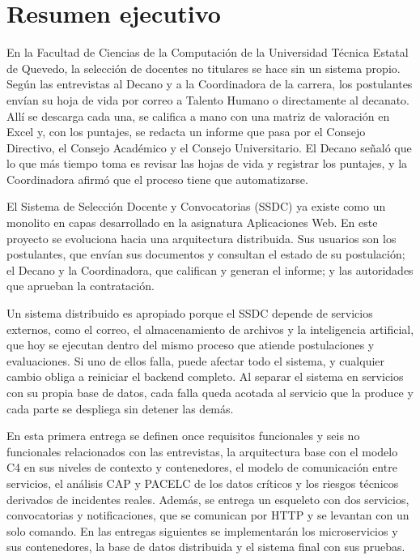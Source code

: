 \section*{Resumen ejecutivo}

En la Facultad de Ciencias de la Computación de la Universidad Técnica Estatal de
Quevedo, la selección de docentes no titulares se hace sin un sistema propio. Según las
entrevistas al Decano y a la Coordinadora de la carrera, los postulantes envían su hoja
de vida por correo a Talento Humano o directamente al decanato. Allí se descarga cada
una, se califica a mano con una matriz de valoración en Excel y, con los puntajes, se
redacta un informe que pasa por el Consejo Directivo, el Consejo Académico y el Consejo
Universitario. El Decano señaló que lo que más tiempo toma es revisar las hojas de vida
y registrar los puntajes, y la Coordinadora afirmó que el proceso tiene que
automatizarse.

El Sistema de Selección Docente y Convocatorias (SSDC) ya existe como un monolito en
capas desarrollado en la asignatura Aplicaciones Web. En este proyecto se evoluciona
hacia una arquitectura distribuida. Sus usuarios son los postulantes, que envían sus
documentos y consultan el estado de su postulación; el Decano y la Coordinadora, que
califican y generan el informe; y las autoridades que aprueban la contratación.

Un sistema distribuido es apropiado porque el SSDC depende de servicios externos, como
el correo, el almacenamiento de archivos y la inteligencia artificial, que hoy se
ejecutan dentro del mismo proceso que atiende postulaciones y evaluaciones. Si uno de
ellos falla, puede afectar todo el sistema, y cualquier cambio obliga a reiniciar el
backend completo. Al separar el sistema en servicios con su propia base de datos, cada
falla queda acotada al servicio que la produce y cada parte se despliega sin detener
las demás.

En esta primera entrega se definen once requisitos funcionales y seis no funcionales
relacionados con las entrevistas, la arquitectura base con el modelo C4 en sus niveles
de contexto y contenedores, el modelo de comunicación entre servicios, el análisis CAP y
PACELC de los datos críticos y los riesgos técnicos derivados de incidentes reales.
Además, se entrega un esqueleto con dos servicios, convocatorias y notificaciones, que
se comunican por HTTP y se levantan con un solo comando. En las entregas siguientes se
implementarán los microservicios y sus contenedores, la base de datos distribuida y el
sistema final con sus pruebas.